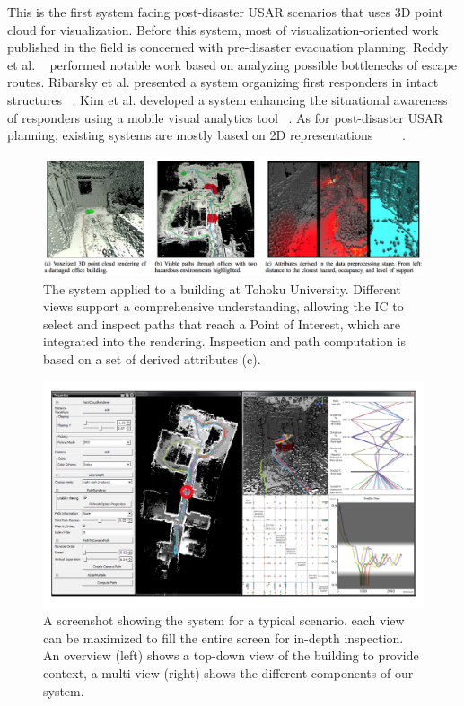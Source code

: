 \documentclass{egpubl}
\begin{document}
This is the first system facing post-disaster USAR scenarios that uses 3D point cloud for visualization. Before this system, most of visualization-oriented work published in the field is concerned with pre-disaster evacuation planning. Reddy et al. ~\cite{reddy2012visual} performed notable work based on analyzing possible bottlenecks of escape routes. Ribarsky et al. presented a system organizing first responders in intact structures ~\cite{ribarsky2010mobile}. Kim et al. developed a system enhancing the situational awareness of responders using a mobile visual analytics tool ~\cite{kim2008mobile}. As for post-disaster USAR planning, existing systems are mostly based on 2D representations ~\cite{kleiner2009operator}~\cite{pellenz2010stable}~\cite{wirth2007exploration}~\cite{dornhege2013frontier}.

\begin{figure}[htb]
  \centering
  \includegraphics[width=.95\linewidth]{star-4-1}
  \caption{\label{fig:star-4-1} The system applied to a building at Tohoku University. Different views support a comprehensive understanding, allowing the IC to select and inspect paths that reach a Point of Interest, which are integrated into the rendering. Inspection and path computation is based on a set of derived attributes (c).}
\end{figure}

\begin{figure}[htb]
  \centering
  \includegraphics[width=.95\linewidth]{star-4-2}
  \caption{\label{fig:star-4-2} A screenshot showing the system for a typical scenario. each view can be maximized to fill the entire screen for in-depth inspection. An overview (left) shows a top-down view of the building to provide context, a multi-view (right) shows the different components of our system.}
\end{figure}
\end{document}
